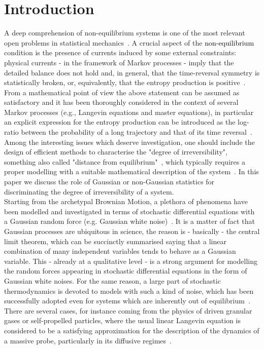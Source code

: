 \documentclass[12pt]{iopart}
\begin{document}
\section{Introduction}
A deep comprehension of non-equilibrium systems
is one of the most relevant open  problems in statistical mechanics~\cite{KTH91}.
A crucial aspect of the \textcolor{black}{non-equilibrium} condition is the presence of currents induced 
by  some external constraints: physical currents - in the framework of Markov processes - imply that the detailed balance does not hold and, in general, that the time-reversal symmetry is statistically broken, or, 
equivalently, that the entropy production  is positive~\cite{BPRV08,Sekimoto2010,seifertrev,pelipigo}.
From a mathematical  point of view  the above statement can be assumed as   satisfactory
and it   has been thoroughly considered  in the context of several  Markov processes 
(e.g., Langevin equations and master equations), in particular an explicit expression for the entropy production
can be  introduced as the log-ratio between the probability of a long trajectory and that  of its time reversal~\cite{lebowitz1999gallavotti}.\\
Among the interesting issues which deserve investigation, one should include
the design of efficient  methods to characterise the  "degree of irreversibility", something also called "distance from equilibrium"~\cite{fodor2016far},
which typically requires a  proper modelling with a suitable mathematical  description of the system~\cite{seifert2019stochastic,skinner21,van2022thermodynamic,lucente2022inference,harunari2022learn,van2023time}. In this paper we discuss the role of Gaussian or non-Gaussian statistics for discriminating the degree of irreversibility of a system.\\
Starting from  the archetypal  Brownian Motion,
a plethora of phenomena have been  modelled and investigated  in terms of stochastic differential  equations with a Gaussian  random force (e.g. Gaussian white noise)~\cite{R89}. 
It is a matter of fact that Gaussian processes are ubiquitous in science, the reason is -  basically -  the central limit theorem, which can be succinctly summarised saying that a linear combination of many independent variables tends to behave as a Gaussian variable.
This - already at a qualitative level - is  a  strong argument for modelling the random forces appearing in stochastic differential equations in the form of Gaussian white noises.
For the same reason,  a large part  of  stochastic thermodynamics is devoted to models with such a kind of noise, which has been  successfully  adopted  even  for systems which are inherently out of equilibrium~\cite{Sekimoto2010,seifertrev,pelipigo}. There are several cases, for instance coming from the physics of driven granular gases or self-propelled particles,  where the usual linear Langevin equation is considered to be a satisfying approximation for the description of the dynamics of a massive probe, particularly in its  diffusive regimes~\cite{scalliet2015cages,lasanta2015itinerant,baldovin2019langevin,plati2020slow}.\\
\end{document}
